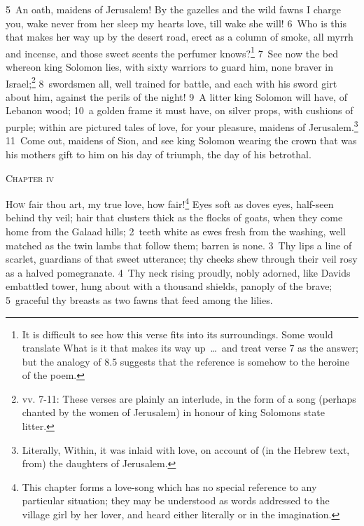 \documentclass[10pt]{book} %
\begin{document}
\textcolor{benred8}{5}~An oath, maidens of Jerusalem! By the gazelles and the wild fawns I charge you, wake never from her sleep my heart\textquotesingle s love, till wake she will!
\textcolor{benred8}{6}~Who is this that makes her way up by the desert road, erect as a column of smoke, all myrrh and incense, and those sweet scents the perfumer knows?\footnote[1]{It is difficult to see how this verse fits into its surroundings. Some would translate \textasciigrave What is it that makes its way up\ \ldots\ \textquotesingle  and treat verse 7 as the answer; but the analogy of 8.5 suggests that the reference is somehow to the heroine of the poem.}
\textcolor{benred8}{7}~See now the bed whereon king Solomon lies, with sixty warriors to guard him, none braver in Israel;\footnote[2]{vv. 7-11: These verses are plainly an interlude, in the form of a song (perhaps chanted by the women of Jerusalem) in honour of king Solomon\textquotesingle s state litter.} \textcolor{benred8}{8}~swordsmen all, well trained for battle, and each with his sword girt about him, against the perils of the night! \textcolor{benred8}{9}~A litter king Solomon will have, of Lebanon wood; \textcolor{benred8}{10}~a golden frame it must have, on silver props, with cushions of purple; within are pictured tales of love, for your pleasure, maidens of Jerusalem.\footnote[3]{Literally, \textasciigrave Within, it was inlaid with love, on account of (in the Hebrew text, from) the daughters of Jerusalem\textquotesingle .} \textcolor{benred8}{11}~Come out, maidens of Sion, and see king Solomon wearing the crown that was his mother\textquotesingle s gift to him on his day of triumph, the day of his betrothal.
\begin{large}\begin{center}\textsc{Chapter iv}\end{center}\end{large}
\lettrine[lines=2]{H}{ow} fair thou art, my true love, how fair!\footnote[1]{This chapter forms a love-song which has no special reference to any particular situation; they may be understood as words addressed to the village girl by her lover, and heard either literally or in the imagination.} Eyes soft as dove\textquotesingle s eyes, half-seen behind thy veil; hair that clusters thick as the flocks of goats, when they come home from the Galaad hills; \textcolor{benred8}{2}~teeth white as ewes fresh from the washing, well matched as the twin lambs that follow them; barren is none. \textcolor{benred8}{3}~Thy lips a line of scarlet, guardians of that sweet utterance; thy cheeks shew through their veil rosy as a halved pomegranate. \textcolor{benred8}{4}~Thy neck rising proudly, nobly adorned, like David\textquotesingle s embattled tower, hung about with a thousand shields, panoply of the brave; \textcolor{benred8}{5}~graceful thy breasts as two fawns that feed among the lilies.
\end{document}
